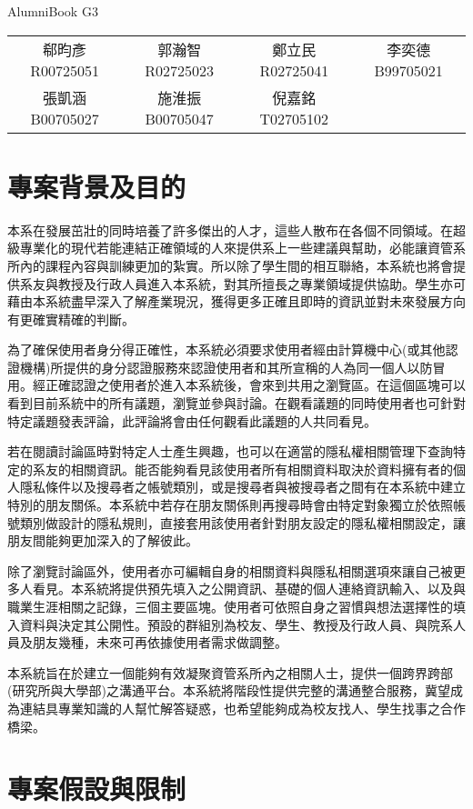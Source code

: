 \documentclass[11pt]{article}
\begin{document}
\begin{center}{\Huge AlumniBook} {G3} \end{center}

\begin{center}
\begin{tabular}{cccc}
郗昀彥 R00725051&郭瀚智 R02725023&鄭立民 R02725041&李奕德 B99705021 \\
張凱涵 B00705027&施淮振 B00705047&倪嘉銘 T02705102&
\end{tabular}
\noindent\makebox[\linewidth]{\rule{\linewidth}{0.4pt}}
\end{center}

\section{專案背景及目的}

本系在發展茁壯的同時培養了許多傑出的人才，這些人散布在各個不同領域。在超級專業化的現代若能連結正確領域的人來提供系上一些建議與幫助，必能讓資管系所內的課程內容與訓練更加的紮實。所以除了學生間的相互聯絡，本系統也將會提供系友與教授及行政人員進入本系統，對其所擅長之專業領域提供協助。學生亦可藉由本系統盡早深入了解產業現況，獲得更多正確且即時的資訊並對未來發展方向有更確實精確的判斷。

為了確保使用者身分得正確性，本系統必須要求使用者經由計算機中心(或其他認證機構)所提供的身分認證服務來認證使用者和其所宣稱的人為同一個人以防冒用。經正確認證之使用者於進入本系統後，會來到共用之瀏覽區。在這個區塊可以看到目前系統中的所有議題，瀏覽並參與討論。在觀看議題的同時使用者也可針對特定議題發表評論，此評論將會由任何觀看此議題的人共同看見。

若在閱讀討論區時對特定人士產生興趣，也可以在適當的隱私權相關管理下查詢特定的系友的相關資訊。能否能夠看見該使用者所有相關資料取決於資料擁有者的個人隱私條件以及搜尋者之帳號類別，或是搜尋者與被搜尋者之間有在本系統中建立特別的朋友關係。本系統中若存在朋友關係則再搜尋時會由特定對象獨立於依照帳號類別做設計的隱私規則，直接套用該使用者針對朋友設定的隱私權相關設定，讓朋友間能夠更加深入的了解彼此。

除了瀏覽討論區外，使用者亦可編輯自身的相關資料與隱私相關選項來讓自己被更多人看見。本系統將提供預先填入之公開資訊、基礎的個人連絡資訊輸入、以及與職業生涯相關之記錄，三個主要區塊。使用者可依照自身之習慣與想法選擇性的填入資料與決定其公開性。預設的群組別為校友、學生、教授及行政人員、與院系人員及朋友幾種，未來可再依據使用者需求做調整。

本系統旨在於建立一個能夠有效凝聚資管系所內之相關人士，提供一個跨界跨部(研究所與大學部)之溝通平台。本系統將階段性提供完整的溝通整合服務，冀望成為連結具專業知識的人幫忙解答疑惑，也希望能夠成為校友找人、學生找事之合作橋梁。

\section{專案假設與限制}
\end{document}
